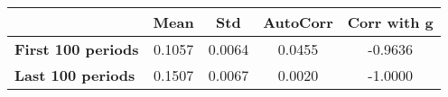 \begin{tiny}\begin{tabular}{|l|c|c|c|c|}
\hline
&\textbf{Mean}&\textbf{Std}&\textbf{AutoCorr}&\textbf{Corr with g}\\\hline
\textbf{First 100 periods}&0.1057&0.0064&0.0455&-0.9636\\\hline
\textbf{Last 100 periods}&0.1507&0.0067&0.0020&-1.0000\\\hline
\end{tabular}
\end{tiny}